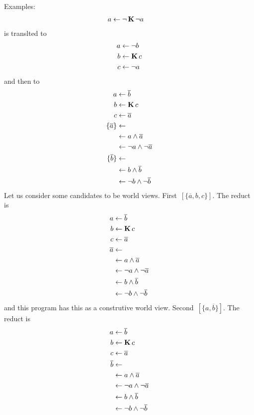 Examples:
\begin{align}
    a & \leftarrow \neg \operatorname{\mathbf{K}} \neg a
\end{align}
is translted to
\begin{align}
    a & \leftarrow \neg b
    \\
    b & \leftarrow \operatorname{\mathbf{K}} c
    \\
    c & \leftarrow \neg a
\end{align}
and then to
\begin{align}
    a & \leftarrow \overline{b}
    \\
    b & \leftarrow \operatorname{\mathbf{K}} c
    \\
    c & \leftarrow \overline{a}
    \\
    \{ \overline{a} \} & \leftarrow
    \\
    & \leftarrow a \wedge \overline{a}
    \\
    & \leftarrow \neg a \wedge \neg \overline{a}
    \\
    \{ \overline{b} \} & \leftarrow
    \\
    & \leftarrow b \wedge \overline{b}
    \\
    & \leftarrow \neg b \wedge \neg \overline{b}
\end{align}
Let us consider some candidates to be world views. First~$[ \{ \overline{a}, b, c \} ]$.
%
The reduct is
\begin{align}
    a & \leftarrow \overline{b}
    \\
    b & \leftarrow \operatorname{\mathbf{K}} c
    \\
    c & \leftarrow \overline{a}
    \\
    \overline{a} & \leftarrow
    \\
    & \leftarrow a \wedge \overline{a}
    \\
    & \leftarrow \neg a \wedge \neg \overline{a}
    \\
    & \leftarrow b \wedge \overline{b}
    \\
    & \leftarrow \neg b \wedge \neg \overline{b}
\end{align}
and this program has this as a construtive world view.
%
Second~$[ \{ a, \overline{b} \} ]$.
%
The reduct is
\begin{align}
    a & \leftarrow \overline{b}
    \\
    b & \leftarrow \operatorname{\mathbf{K}} c
    \\
    c & \leftarrow \overline{a}
    \\
    \overline{b} & \leftarrow
    \\
    & \leftarrow a \wedge \overline{a}
    \\
    & \leftarrow \neg a \wedge \neg \overline{a}
    \\
    & \leftarrow b \wedge \overline{b}
    \\
    & \leftarrow \neg b \wedge \neg \overline{b}
\end{align}
